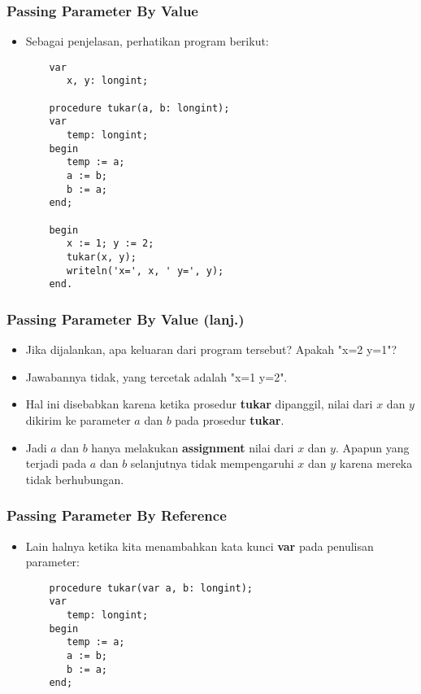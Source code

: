 \documentclass{beamer}
\begin{document}
\begin{frame}[fragile]
\frametitle{Passing Parameter By Value}
\begin{itemize}
	\item Sebagai penjelasan, perhatikan program berikut:
	\begin{lstlisting}
	var
	   x, y: longint;
	
	procedure tukar(a, b: longint);
	var
	   temp: longint;
	begin
	   temp := a;
	   a := b;
	   b := a;
	end;
	
	begin
	   x := 1; y := 2;
	   tukar(x, y);
	   writeln('x=', x, ' y=', y);
	end.
	\end{lstlisting}
\end{itemize}
\end{frame}

\begin{frame}[fragile]
\frametitle{Passing Parameter By Value (lanj.)}
\begin{itemize}
	\item Jika dijalankan, apa keluaran dari program tersebut? Apakah "x=2 y=1"?
	\item Jawabannya \alert{tidak}, yang tercetak adalah "x=1 y=2".
	\item Hal ini disebabkan karena ketika prosedur \textbf{tukar} dipanggil, \alert{nilai} dari $x$ dan $y$ dikirim ke parameter $a$ dan $b$ pada prosedur \textbf{tukar}.
	\item Jadi $a$ dan $b$ hanya melakukan \textbf{assignment} nilai dari $x$ dan $y$. Apapun yang terjadi pada $a$ dan $b$ selanjutnya tidak mempengaruhi $x$ dan $y$ karena mereka \alert{tidak berhubungan}.
\end{itemize}
\end{frame}

\begin{frame}[fragile]
\frametitle{Passing Parameter By Reference}
\begin{itemize}
	\item Lain halnya ketika kita menambahkan kata kunci \textbf{var} pada penulisan parameter:
	\begin{lstlisting}
	procedure tukar(var a, b: longint);
	var
	   temp: longint;
	begin
	   temp := a;
	   a := b;
	   b := a;
	end;
	\end{lstlisting}
\end{itemize}
\end{frame}
\end{document}
